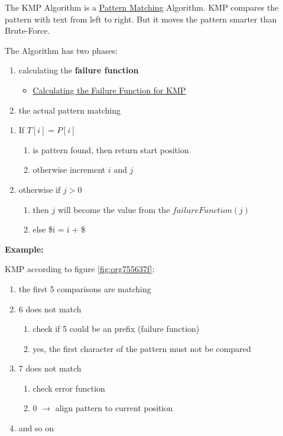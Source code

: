 \documentclass[11pt,twoside,twocolumn,landscape]{article}
\begin{document}
The KMP Algorithm is a \href{../../../roam/20211215163350-pattern_matching.org}{Pattern Matching} Algorithm.
KMP compares the pattern with text from left to right.
But it moves the pattern smarter than Brute-Force.

The Algorithm has two phases:
\begin{enumerate}
\item calculating the \textbf{failure function}
\begin{itemize}
\item \href{../../../roam/20211215171140-calculating_the_failure_function_for_kmp.org}{Calculating the Failure Function for KMP}
\end{itemize}
\item the actual pattern matching
\end{enumerate}


\begin{enumerate}
\item If \(T[i] = P[i]\)
\begin{enumerate}
\item is pattern found, then return start position
\item otherwise increment \(i\) and \(j\)
\end{enumerate}
\item otherwise if \(j > 0\) 
\begin{enumerate}
\item then \(j\) will become the value from the \(failureFunction(j)\)
\item else \$i = i + \$
\end{enumerate}
\end{enumerate}


\textbf{Example:}

KMP according to figure \ref{fig:org755637f}:
\begin{enumerate}
\item the first 5 comparisons are matching
\item 6 does not match
\begin{enumerate}
\item check if 5 could be an prefix (failure function)
\item yes, the first character of the pattern must not be compared
\end{enumerate}
\item 7 does not match
\begin{enumerate}
\item check error function
\item 0 \(\rightarrow\) align pattern to current position
\end{enumerate}
\item and so on
\end{enumerate}
\end{document}
